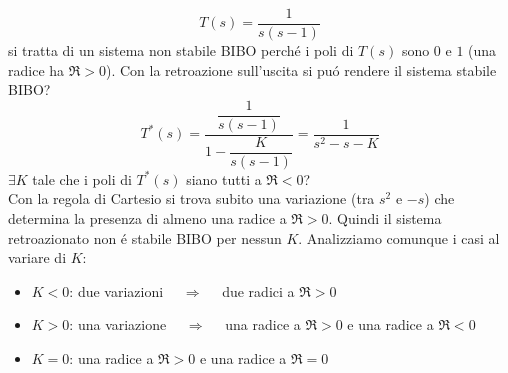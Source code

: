 \documentclass[../main.tex]{subfiles}
\begin{document}
		\begin{mdframed}[style=Exercise]
			\begin{Exercise}[title={Studio stabilit\'a BIBO dopo retroazione sull'uscita}, difficulty=1]
				\[
					T(s) = \dfrac{1}{s(s-1)}
				\]
				si tratta di un sistema non stabile BIBO perch\'e i poli di $ T(s) $ sono $ 0 $ e $ 1 $ (una radice ha $ \Re > 0 $). Con la retroazione sull'uscita si pu\'o rendere il sistema stabile BIBO?
				\[
					T^{*}(s) = \dfrac{\dfrac{1}{s(s-1)}}{1-\dfrac{K}{s(s-1)}} = \dfrac{1}{s^2-s-K}
				\]
				$ \exists K $ tale che i poli di $ T^{*}(s) $ siano tutti a $ \Re < 0 $?\\
				Con la regola di Cartesio si trova subito una variazione (tra $ s^2 $ e $ -s $) che determina la presenza di almeno una radice a $ \Re > 0 $. Quindi il sistema retroazionato non \'e stabile BIBO per nessun $ K $. Analizziamo comunque i casi al variare di $ K $:
				\begin{itemize}
					\item $ K < 0 $: due variazioni $ \quad\Rightarrow\quad $ due radici a $ \Re > 0 $
					\item $ K > 0 $: una variazione $ \quad\Rightarrow\quad $ una radice a $ \Re > 0 $ e una radice a $ \Re < 0 $
					\item $ K = 0 $: una radice a $ \Re > 0 $ e una radice a $ \Re = 0 $
				\end{itemize}
			\end{Exercise}
		\end{mdframed}
\end{document}
